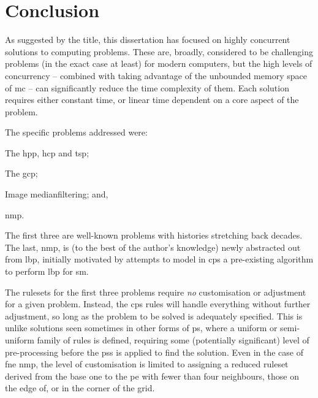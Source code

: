 \chapter{\label{chap:conc}Conclusion}


As suggested by the title, this dissertation has focused on highly concurrent solutions to computing problems.  These are, broadly, considered to be challenging problems (in the exact case at least) for modern computers, but the high levels of concurrency -- combined with taking advantage of the unbounded memory space of \gls{mc} -- can significantly reduce the time complexity of them.  Each solution requires either constant time, or linear time dependent on a core aspect of the problem.

The specific problems addressed were:
\begin{inparaenum}[(1)]
\item The \gls{hpp}, \gls{hcp} and \gls{tsp};
\item The \gls{gcp};
\item Image \gls{medianfilter}ing; and,
\item \gls{nmp}.
\end{inparaenum}
The first three are well-known problems with histories stretching back decades.  The last, \gls{nmp}, is (to the best of the author's knowledge) newly abstracted out from \gls{lbp}, initially motivated by attempts to model in \gls{cps} a pre-existing algorithm to perform \gls{lbp} for \gls{sm}.

The \glspl{ruleset} for the first three problems require \emph{no} customisation or adjustment for a given problem.  Instead, the \gls{cps} rules will handle everything without further adjustment, so long as the problem to be solved is adequately specified.  This is unlike solutions seen sometimes in other forms of \gls{ps}, where a uniform or semi-uniform family of rules is defined, requiring some (potentially significant) level of pre-processing before the \glspl{ps} is applied to find the solution.  Even in the case of \gls{fne} \gls{nmp}, the level of customisation is limited to assigning a reduced \gls{ruleset} derived from the base one to the \gls{pe} with fewer than four neighbours, \ie{} those on the edge of, or in the corner of the grid.

